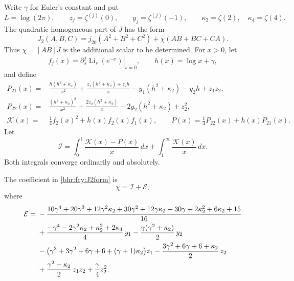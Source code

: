 Write \(\gamma\) for Euler's constant and put
\[
 L=\log(2\pi),\qquad z_j=\zeta^{(j)}(0),\qquad
 y_j=\zeta^{(j)}(-1),\qquad \kappa_2=\zeta(2),\quad \kappa_4=\zeta(4).
\]
The quadratic homogeneous part of \(J\) has the form
\begin{equation}\label{bhr:fcy:J2form}
 J_2(A,B,C)=j_{20}(A^2+B^2+C^2)+\chi(AB+BC+CA).
\end{equation}
Thus \(\chi=[AB]J\) is the additional scalar to be determined.
For \(x>0\), let
\[
 f_j(x)=\left.\partial_s^j\operatorname{Li}_s(e^{-x})\right|_{s=0},
 \qquad h(x)=\log x+\gamma,
\]
and define
\begin{align}
 P_{21}(x)={}&\frac{h(h^2+\kappa_2)}{x^2}
 +\frac{z_1(h^2+\kappa_2)+z_2h}{x}
 -y_1(h^2+\kappa_2)-y_2h+z_1z_2,
 \label{bhr:fcy:P21}\\
 P_{22}(x)={}&\frac{(h^2+\kappa_2)^2}{x^2}
 +\frac{2z_2(h^2+\kappa_2)}{x}-2y_2(h^2+\kappa_2)+z_2^2,
 \label{bhr:fcy:P22}\\
 \mathcal K(x)={}&\frac14 f_2(x)^2+h(x)f_2(x)f_1(x),\qquad
 P(x)=\frac14P_{22}(x)+h(x)P_{21}(x).
 \label{bhr:fcy:KP}
\end{align}
Let
\begin{equation}\label{bhr:fcy:chiintegral}
 \mathcal I=\int_0^1\frac{\mathcal K(x)-P(x)}x\,dx
                   +\int_1^\infty\frac{\mathcal K(x)}x\,dx.
\end{equation}
Both integrals converge ordinarily and absolutely.

\begin{theorem}
\label{bhr:fcy:chi}
The coefficient in \eqref{bhr:fcy:J2form} is
\begin{equation}\label{bhr:fcy:chiresult}
 \chi=\mathcal I+\mathcal E,
\end{equation}
where
\begin{align}
 \mathcal E={}&-\frac{10\gamma^4+20\gamma^3+12\gamma^2\kappa_2
 +30\gamma^2+12\gamma \kappa_2+30\gamma+2\kappa_2^2+6\kappa_2+15}{16}
 \notag\\
 &+\frac{-\gamma^4-2\gamma^2\kappa_2+\kappa_2^2+2\kappa_4}{4}\,y_1
 -\frac{\gamma(\gamma^2+\kappa_2)}2\,y_2\notag\\
 &-\bigl(\gamma^3+3\gamma^2+6\gamma+6+(\gamma+1)\kappa_2\bigr)z_1
 -\frac{3\gamma^2+6\gamma+6+\kappa_2}{2}\,z_2\notag\\
 &+\frac{\gamma^2-\kappa_2}{2}\,z_1z_2+\frac\gamma4z_2^2.
 \label{bhr:fcy:chicorrection}
\end{align}
\end{theorem}

